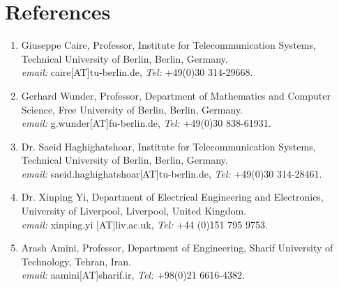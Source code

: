 \documentclass[a4paper,10pt]{article}
\begin{document}
\section{References}
\begin{enumerate}
	\item Giuseppe Caire, Professor, Institute for Telecommunication Systems, Technical University of Berlin, Berlin, Germany.\\
	\textit{email:} {\sf caire[AT]tu-berlin.de}, \hspace{26mm} \textit{Tel:} +49(0)30 314-29668.
	\item Gerhard Wunder, Professor, Department of Mathematics and Computer Science, Free University of Berlin, Berlin, Germany.\\
	\textit{email:} {\sf g.wunder[AT]fu-berlin.de}, \hspace{20mm} \textit{Tel:} +49(0)30 838-61931.	
	\item Dr. Saeid Haghighatshoar, Institute for Telecommunication Systems, Technical University of Berlin, Berlin, Germany.\\
	\textit{email:} {\sf saeid.haghighatshoar[AT]tu-berlin.de}, \hspace{3mm} \textit{Tel:} +49(0)30 314-28461.	
	\item  Dr. Xinping Yi, Department of Electrical Engineering and Electronics, University of Liverpool, Liverpool, United Kingdom.\\
	\textit{email:} {\sf xinping.yi [AT]liv.ac.uk}, \hspace{22mm} \textit{Tel:} +44 (0)151 795 9753.	
	\item Arash Amini, Professor, Department of Engineering, Sharif University of Technology, Tehran, Iran.\\
	\textit{email:} {\sf aamini[AT]sharif.ir}, \hspace{29mm} \textit{Tel:} +98(0)21 6616-4382.	
\end{enumerate}
%
\end{document}
